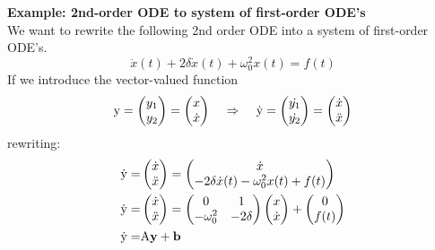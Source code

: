 \textbf{Example: 2nd-order ODE to system of first-order ODE's}\\
We want to rewrite the following 2nd order ODE into a system of first-order ODE's.
\begin{equation}
  \ddot{x}(t) + 2\delta\dot{x}(t) + \omega_0^2x(t) = f(t)
\end{equation}
If we introduce the vector-valued function
\begin{equation}
  \textup{y} = \begin{pmatrix} y_1 \\ y_2 \end{pmatrix} =
                \begin{pmatrix} x \\ \dot{x} \end{pmatrix} \;\;\;\;  \Rightarrow \;\;\;\;
                \dot{\textup{y}} =
                \begin{pmatrix} \dot{y_1} \\ \dot{y_2} \end{pmatrix} =
                \begin{pmatrix} \dot{x} \\ \ddot{x} \end{pmatrix}
\end{equation}
rewriting:
\begin{equation}
  \begin{split}
      \dot{\textup{y}} =& \begin{pmatrix} \dot{x} \\ \ddot{x} \end{pmatrix} =
                          \begin{pmatrix} \dot{x} \\ -2\delta\dot{x}(t) - \omega_0^2x(t) + f(t) \end{pmatrix}\\
      \dot{\textup{y}} =& \begin{pmatrix} \dot{x} \\ \ddot{x} \end{pmatrix} =
                          \begin{pmatrix} 0 & 1 \\ -\omega_0^2 & -2\delta \end{pmatrix}
                          \begin{pmatrix} x\\ \dot{x} \end{pmatrix} +
                          \begin{pmatrix} 0 \\ f(t) \end{pmatrix}\\
      \dot{\textup{y}} =& \textup{A}\textbf{y} + \mathbf{b}
  \end{split}
\end{equation}
